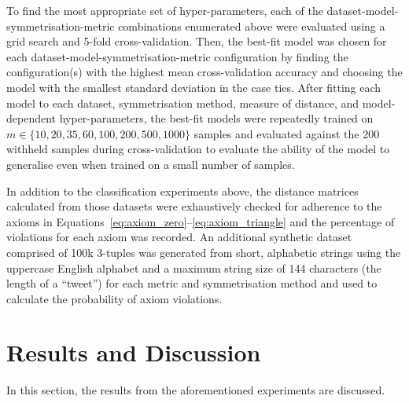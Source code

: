 \documentclass[preprint,12pt]{article}
\begin{document}
To find the most appropriate set of hyper-parameters, each of the dataset-model-symmetrisation-metric combinations enumerated above were evaluated using a grid search and 5-fold cross-validation.
Then, the best-fit model was chosen for each dataset-model-symmetrisation-metric configuration by finding the configuration(s) with the highest mean cross-validation accuracy and choosing the model with the smallest standard deviation in the case ties.
After fitting each model to each dataset, symmetrisation method, measure of distance, and model-dependent hyper-parameters, the best-fit models were repeatedly trained on $m \in \{10, 20, 35, 60, 100, 200, 500, 1000\}$ samples and evaluated against the 200 withheld samples during cross-validation to evaluate the ability of the model to generalise even when trained on a small number of samples.

In addition to the classification experiments above, the distance matrices calculated from those datasets were exhaustively checked for adherence to the axioms in Equations~\ref{eq:axiom_zero}--\ref{eq:axiom_triangle} and the percentage of violations for each axiom was recorded. 
An additional synthetic dataset comprised of 100k 3-tuples was generated from short, alphabetic strings using the uppercase English alphabet and a maximum string size of 144 characters (the length of a ``tweet'') for each metric and symmetrisation method and used to calculate the probability of axiom violations.


\section{Results and Discussion}
\label{results}

In this section, the results from the aforementioned experiments are discussed. 
\end{document}

